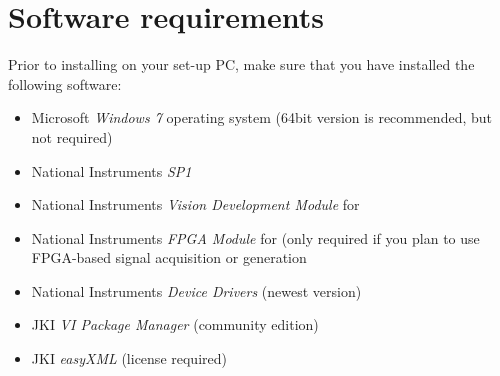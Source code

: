 \section{Software requirements}

Prior to installing \HS on your set-up PC, make sure that you have installed the following software:
\begin{itemize}[noitemsep]
	\item Microsoft \textit{Windows 7} operating system (64bit version is recommended, but not required)
	\item National Instruments \textit{ SP1}
	\item National Instruments \textit{Vision Development Module} for 
	\item National Instruments \textit{FPGA Module} for  (only required if you plan to use FPGA-based signal acquisition or generation
	\item National Instruments \textit{Device Drivers} (newest version)
	\item JKI \textit{VI Package Manager} (community edition)
	\item JKI \textit{easyXML} (license required)
\end{itemize}